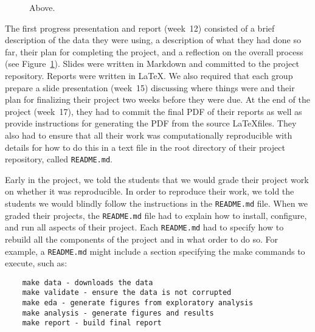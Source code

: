 \begin{figure}
\centering
\begin{tiny}

\end{tiny}
\caption{Above.}\label{fig:progress}
\end{figure}


The first progress presentation and report (week~12) consisted of a brief
description of the data they were using, a description of what they had done so
far, their plan for completing the project, and a reflection on the overall
process (see Figure~\ref{fig:progress}).
Slides were written in Markdown and committed to the project repository.
Reports were written in \LaTeX.
We also required that each group prepare a slide presentation (week~15)
discussing where things were and their plan for finalizing their project two
weeks before they were due.
At the end of the project (week~17), they had to commit the final PDF of their
reports as well as provide instructions for generating the PDF from the source
\LaTeX files.
They also had to ensure that all their work was computationally reproducible
with details for how to do this in a text file in the root directory of
their project repository, called \texttt{README.md}.

Early in the project, we told the students that we would grade their project
work on whether it was reproducible.  In order to reproduce their work, we
told the students we would blindly follow the instructions in the
\texttt{README.md} file.
When we graded their projects, the \texttt{README.md} file had to explain how
to install, configure, and run all aspects of their project.
Each \texttt{README.md} had to specify how to rebuild all the components of
the project and in what order to do so.
For example, a \texttt{README.md} might include a section specifying
the make commands to execute, such as:
\begin{verbatim}
    make data - downloads the data 
    make validate - ensure the data is not corrupted
    make eda - generate figures from exploratory analysis
    make analysis - generate figures and results
    make report - build final report
\end{verbatim}


